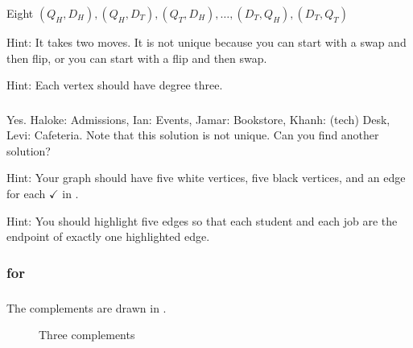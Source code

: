 \subsubsection*{ \answers}
\begin{apart}
    \item Eight  $(Q_H,D_H), (Q_H,D_T), (Q_T,D_H), \ldots,(D_T,Q_H), (D_T,Q_T)$
    \item Hint: It takes two moves.  It is not unique because you can start with a swap and then flip, or you can start with a flip and then swap.
    \item Hint: Each vertex should have degree three.
\end{apart}

\subsubsection*{ \answers}
\begin{apart}
    \item Yes. Haloke: Admissions, Ian: Events, Jamar: Bookstore, Khanh: (tech) Desk, Levi: Cafeteria.  Note that this solution is not unique.  Can you find another solution?
    \item Hint: Your graph should have five white vertices, five black vertices, and an edge for each $\checkmark$ in .
    \item Hint: You should highlight five edges so that each student and each job are the endpoint of exactly one highlighted edge.
\end{apart}

\subsubsection{\answers for  \subgraphcomp}

\subsubsection*{ \answers}
   The complements are drawn in .

    \begin{figure}[hbtp]
        \centering
        
        \caption{Three complements}
        \label{fig_three_comp_answer}
    \end{figure}
    
